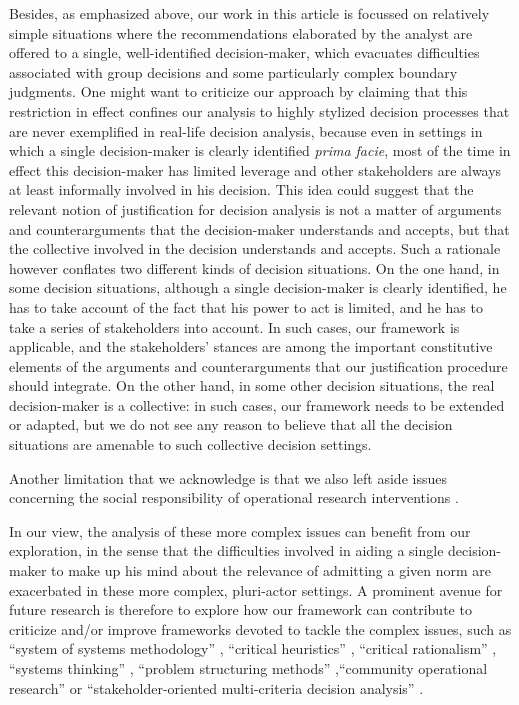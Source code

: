 \documentclass[preprint, french, english, 11pt, authoryear]{elsarticle}%
\begin{document}
Besides, as emphasized above, our work in this article is focussed on relatively simple situations where the recommendations elaborated by the analyst are offered to a single, well-identified decision-maker, which evacuates difficulties associated with group decisions and some particularly complex boundary judgments. One might want to criticize our approach by claiming that this restriction in effect confines our analysis to highly stylized decision processes that are never exemplified in real-life decision analysis, because even in settings in which a single decision-maker is clearly identified \emph{prima facie}, most of the time in effect this decision-maker has limited leverage and other stakeholders are always at least informally involved in his decision. This idea could suggest that the relevant notion of justification for decision analysis is not a matter of arguments and counterarguments that the decision-maker understands and accepts, but that the collective involved in the decision understands and accepts. Such a rationale however conflates two different kinds of decision situations. On the one hand, in some decision situations, although a single decision-maker is clearly identified, he has to take account of the fact that his power to act is limited, and he has to take a series of stakeholders into account. In such cases, our framework is applicable, and the stakeholders' stances are among the important constitutive elements of the arguments and counterarguments that our justification procedure should integrate. On the other hand, in some other decision situations, the real decision-maker is a collective: in such cases, our framework needs to be extended or adapted, but we do not see any reason to believe that all the decision situations are amenable to such collective decision settings. 

Another limitation that we acknowledge is that we also left aside issues concerning the social responsibility of operational research interventions \citep{ackoff_social_1974,gallo_operations_2004}.

In our view, the analysis of these more complex issues can benefit from our exploration, in the sense that the difficulties involved in aiding a single decision-maker to make up his mind about the relevance of admitting a given norm are exacerbated in these more complex, pluri-actor settings. A prominent avenue for future research is therefore to explore how our framework can contribute to criticize and/or improve frameworks devoted to tackle the complex issues, such as ``system of systems methodology'' \citep{jackson_towards_1984}, ``critical heuristics'' \citep{ulrich_critical_1987}, ``critical rationalism'' \citep{ormerod_critical_2014}, ``systems thinking'' \citep{mingers_review_2010}, ``problem structuring methods'' \citep{hector_problem-structuring_2009},``community operational research'' \citep{johnson_emerging_2018} or ``stakeholder-oriented multi-criteria decision analysis'' \citep{de_brucker_multi-criteria_2013}.
\end{document}
